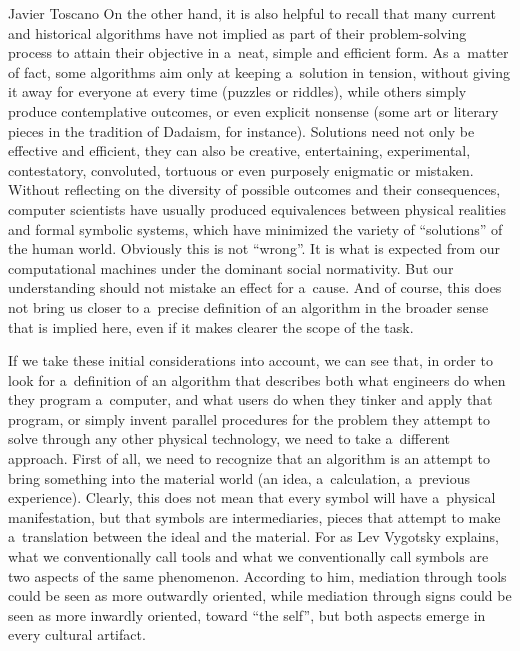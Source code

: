 \begin{artengenv}{Javier Toscano}
On the other hand, it is also helpful to recall that many current and historical algorithms have not implied as part of their problem-solving process to attain their objective in a~neat, simple and efficient form. As a~matter of fact, some algorithms aim only at keeping a~solution in tension, without giving it away for everyone at every time (puzzles or riddles), while others simply produce contemplative outcomes, or even explicit nonsense (some art or literary pieces in the tradition of Dadaism, for instance). Solutions need not only be effective and efficient, they can also be creative, entertaining, experimental, contestatory, convoluted, tortuous or even purposely enigmatic or mistaken. Without reflecting on the diversity of possible outcomes and their consequences, computer scientists have usually produced equivalences between physical realities and formal symbolic systems, which have minimized the variety of ``solutions'' of the human world. Obviously this is not ``wrong''. It is what is expected from our computational machines under the dominant social normativity. But our understanding should not mistake an effect for a~cause. And of course, this does not bring us closer to a~precise definition of an algorithm in the broader sense that is implied here, even if it makes clearer the scope of the task.

If we take these initial considerations into account, we can see that, in order to look for a~definition of an algorithm that describes both what engineers do when they program a~computer, and what users do when they tinker and apply that program, or simply invent parallel procedures for the problem they attempt to solve through any other physical technology, we need to take a~different approach. First of all, we need to recognize that an algorithm is an attempt to bring something into the material world (an idea, a~calculation, a~previous experience). Clearly, this does not mean that every symbol will have a~physical manifestation, but that symbols are intermediaries, pieces that attempt to make a~translation between the ideal and the material. For as Lev Vygotsky
\parencite*[][]{vygotsky_tool_1978} %
 explains, what we conventionally call tools and what we conventionally call symbols are two aspects of the same phenomenon. According to him, mediation through tools could be seen as more outwardly oriented, while mediation through signs could be seen as more inwardly oriented, toward ``the self'', but both aspects emerge in every cultural artifact.


\end{artengenv}
